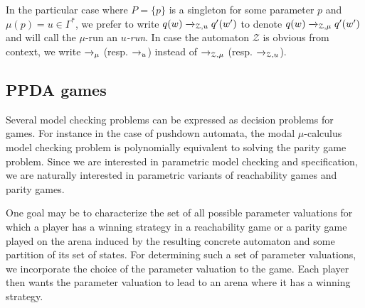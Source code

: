 \documentclass[a4paper,UKenglish,cleveref, autoref, thm-restate]{lipics-v2021}
\newcommand{\problemx}[3]{
	\vspace{0.2cm}
\par\noindent\underline{\sc#1}\par\nobreak\vskip.2\baselineskip
\begingroup\clubpenalty10000\widowpenalty10000
\setbox0\hbox{\bf INPUT:\ }\setbox1\hbox{\bf QUESTION:\ }
\dimen0=\wd0\ifnum\wd1>\dimen0\dimen0=\wd1\fi
\vskip-\parskip\noindent
\hbox to\dimen0{\box0\hfil}\hangindent\dimen0\hangafter1\ignorespaces#2\par
\vskip-\parskip\noindent
\hbox to\dimen0{\box1\hfil}\hangindent\dimen0\hangafter1\ignorespaces#3\par
\endgroup
	\vspace{-0.2cm}
}
\begin{document}
In the particular case where $P=\{p\}$ is a singleton for some parameter $p$ and $\mu(p)=u \in \Gamma^*$,
we prefer to write $q(w)\xrightarrow{%
}_{\mathcal{Z}, u}q'(w')$
to denote $q(w)\xrightarrow{%
}_{\mathcal{Z}, \mu}q'(w')$ and
will call the $\mu$-run an {\em $u$-run}. In case the automaton $\mathcal{Z}$ is obvious from context, we write $\xrightarrow{%
}_{\mu}$ (resp. $\xrightarrow{%
}_{u}$)
instead of $\xrightarrow{%
}_{\mathcal{Z}, \mu}$ (resp. $\xrightarrow{%
}_{\mathcal{Z},u}$). \\

\subsection{PPDA games}


Several model checking problems can be
expressed as decision problems for games.
For instance 
in the case of pushdown automata, 
the modal $\mu$-calculus
model checking problem is polynomially equivalent to solving the parity game problem.
Since we are interested in parametric model checking and specification,
we are naturally interested in parametric variants of reachability games and parity games.

One goal may be to characterize the set of all possible parameter valuations for which a player has a winning strategy in a 
reachability game or a parity game
played on the arena induced by the
resulting concrete automaton
and some partition of its set of states. 
For determining such a set of parameter valuations, we incorporate the choice of the parameter valuation to the game. Each player then wants the parameter valuation to lead to an arena where it has a winning strategy.
\end{document}
